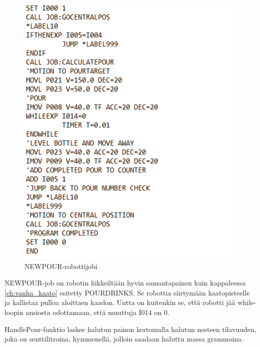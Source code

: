 \begin{figure}[h]
\begin{center}
\includegraphics[scale=0.8]{img/NEWPOUR.png}
\end{center}
\caption{NEWPOUR-robottijobi}
\label{fig:NEWPOUR}
\end{figure}
\newpage

NEWPOUR-job on robotin liikkeiltään hyvin samantapainen kuin kappaleessa \ref{ch:vanha_kaato} esitetty POURDRINKS. Se robottia siirtymään kaatopisteelle ja kallistaa pulloa aloittaen kaadon. Uutta on kuitenkin se, että robotti jää while-loopin ansiosta odottamaan, että muuttuja I014 on 0.

HandlePour-funktio laskee halutun painon kertomalla halutun nesteen tilavuuden, joka on senttilitroina, kymmenellä, jolloin saadaan haluttu massa grammoina.
